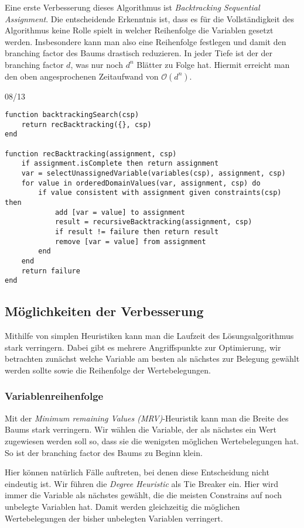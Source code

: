 Eine erste Verbesserung dieses Algorithmus ist \emph{Backtracking Sequential Assignment}. Die entscheidende Erkenntnis ist, dass es für die Vollständigkeit des Algorithmus keine Rolle spielt in welcher Reihenfolge die Variablen gesetzt werden.
Insbesondere kann man also eine Reihenfolge festlegen und damit den branching factor des Baums drastisch reduzieren. In jeder Tiefe ist der der branching factor $d$, was nur noch $d^n$ Blätter zu Folge hat.
Hiermit erreicht man den oben angesprochenen Zeitaufwand von $\mathcal O(d^n)$.

08/13
\begin{lstlisting}
function backtrackingSearch(csp)
	return recBacktracking({}, csp)
end

function recBacktracking(assignment, csp)
	if assignment.isComplete then return assignment
	var = selectUnassignedVariable(variables(csp), assignment, csp)
	for value in orderedDomainValues(var, assignment, csp) do
		if value consistent with assignment given constraints(csp) then
			add [var = value] to assignment
			result = recursiveBacktracking(assignment, csp)
			if result != failure then return result
			remove [var = value] from assignment
		end
	end
	return failure
end
\end{lstlisting}

\subsection{Möglichkeiten der Verbesserung}
Mithilfe von simplen Heuristiken kann man die Laufzeit des Lösungsalgorithmus stark verringern. Dabei gibt es mehrere Angriffspunkte zur Optimierung, wir betrachten zunächst welche Variable am besten als nächstes zur Belegung gewählt werden sollte sowie die Reihenfolge der Wertebelegungen.
\subsubsection{Variablenreihenfolge}
Mit der \emph{Minimum remaining Values (MRV)}-Heuristik kann man die Breite des Baums stark verringern. Wir wählen die Variable, der als nächstes ein Wert zugewiesen werden soll so, dass sie die wenigsten möglichen Wertebelegungen hat. So ist der branching factor des Baums zu Beginn klein.

Hier können natürlich Fälle auftreten, bei denen diese Entscheidung nicht eindeutig ist. Wir führen die \emph{Degree Heuristic} als Tie Breaker ein. Hier wird immer die Variable als nächstes gewählt, die die meisten Constrains auf noch unbelegte Variablen hat. Damit werden gleichzeitig die möglichen Wertebelegungen der bisher unbelegten Variablen verringert.


